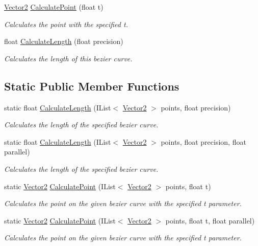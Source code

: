 \begin{DoxyCompactItemize}
\hyperlink{struct_open_t_k_1_1_vector2}{Vector2} \hyperlink{struct_open_t_k_1_1_bezier_curve_a51852f049183eed482ccfcb5f3917ff3}{Calculate\-Point} (float t)
\begin{DoxyCompactList}\small\item\em Calculates the point with the specified t. \end{DoxyCompactList}\item 
float \hyperlink{struct_open_t_k_1_1_bezier_curve_afc6f7476067b003e8242af3212c093bf}{Calculate\-Length} (float precision)
\begin{DoxyCompactList}\small\item\em Calculates the length of this bezier curve. \end{DoxyCompactList}\end{DoxyCompactItemize}
\subsection*{Static Public Member Functions}
\begin{DoxyCompactItemize}
\item 
static float \hyperlink{struct_open_t_k_1_1_bezier_curve_adb71bfc6a400e1c53e7ca0e05f21c676}{Calculate\-Length} (I\-List$<$ \hyperlink{struct_open_t_k_1_1_vector2}{Vector2} $>$ points, float precision)
\begin{DoxyCompactList}\small\item\em Calculates the length of the specified bezier curve. \end{DoxyCompactList}\item 
static float \hyperlink{struct_open_t_k_1_1_bezier_curve_a5dd57c1cf86e69ceaf56d12ae78b2a8a}{Calculate\-Length} (I\-List$<$ \hyperlink{struct_open_t_k_1_1_vector2}{Vector2} $>$ points, float precision, float parallel)
\begin{DoxyCompactList}\small\item\em Calculates the length of the specified bezier curve. \end{DoxyCompactList}\item 
static \hyperlink{struct_open_t_k_1_1_vector2}{Vector2} \hyperlink{struct_open_t_k_1_1_bezier_curve_a5fa54fd9e50e73c3669a023d4eceeeaf}{Calculate\-Point} (I\-List$<$ \hyperlink{struct_open_t_k_1_1_vector2}{Vector2} $>$ points, float t)
\begin{DoxyCompactList}\small\item\em Calculates the point on the given bezier curve with the specified t parameter. \end{DoxyCompactList}\item 
static \hyperlink{struct_open_t_k_1_1_vector2}{Vector2} \hyperlink{struct_open_t_k_1_1_bezier_curve_af4188ece61199d02a08d15898a3ff694}{Calculate\-Point} (I\-List$<$ \hyperlink{struct_open_t_k_1_1_vector2}{Vector2} $>$ points, float t, float parallel)
\begin{DoxyCompactList}\small\item\em Calculates the point on the given bezier curve with the specified t parameter. \end{DoxyCompactList}\end{DoxyCompactItemize}
